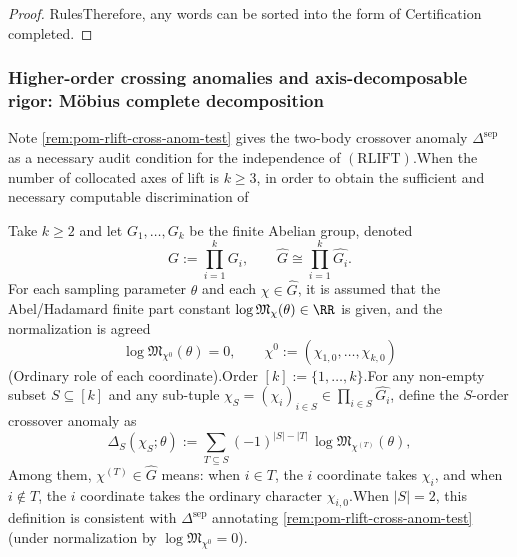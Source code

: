 \begin{proof}
RulesTherefore, any words can be sorted into the form of Certification completed.\end{proof}

\subsubsection{Higher-order crossing anomalies and axis-decomposable rigor: Möbius complete decomposition}\label{subsec:pom-rlift-higher-cross-anom}
Note \ref{rem:pom-rlift-cross-anom-test} gives the two-body crossover anomaly \(\Delta^{\mathrm{sep}}\) as a necessary audit condition for the independence of \((\mathrm{RLIFT})\).When the number of collocated axes of lift is \(k\ge 3\), in order to obtain the {sufficient and necessary} computable discrimination of
\begin{definition}\label{def:pom-higher-cross-anomaly}Take \(k\ge 2\) and let \(G_1,\dots,G_k\) be the finite Abelian group, denoted\[
G:=\prod_{i=1}^k G_i,
\qquad
\widehat G\cong \prod_{i=1}^k \widehat{G_i}.
\]
For each sampling parameter \(\theta\) and each \(\chi\in\widehat G\), it is assumed that the Abel/Hadamard finite part constant \(\log\mathfrak{M}_{\chi}(\theta)\in\RR\) is given, and the normalization is agreed\[
\log\mathfrak{M}_{\chi^0}(\theta)=0,
\qquad
\chi^0:=(\chi_{1,0},\dots,\chi_{k,0})
\]
(Ordinary role of each coordinate).Order \([k]:=\{1,\dots,k\}\).For any non-empty subset \(S\subseteq[k]\) and any sub-tuple \(\chi_S=(\chi_i)_{i\in S}\in\prod_{i\in S}\widehat{G_i}\), define the \(S\)-order crossover anomaly as\[
\Delta_S(\chi_S;\theta)
:=\sum_{T\subseteq S}(-1)^{|S|-|T|}\,\log\mathfrak{M}_{\chi^{(T)}}(\theta),
\]
Among them, \(\chi^{(T)}\in\widehat G\) means: when \(i\in T\), the \(i\) coordinate takes \(\chi_i\), and when \(i\notin T\), the \(i\) coordinate takes the ordinary character \(\chi_{i,0}\).When \(|S|=2\), this definition is consistent with \(\Delta^{\mathrm{sep}}\) annotating \ref{rem:pom-rlift-cross-anom-test} (under normalization by \(\log\mathfrak{M}_{\chi^0}=0\)).\end{definition}

